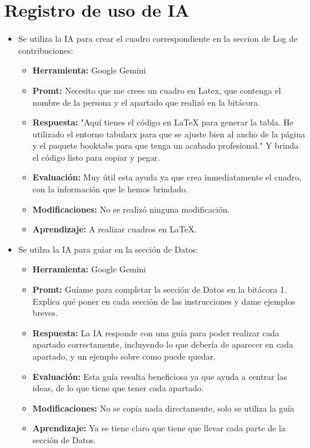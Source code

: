 \documentclass[12pt]{article}
\begin{document}
\section{Registro de uso de IA}
\begin{itemize}
    \item Se utiliza la IA para crear el cuadro correspondiente en la seccion de Log de contribuciones:
    \begin{itemize}
        \item \textbf{Herramienta:} Google Gemini
        \item \textbf{Promt:} Necesito que me crees un cuadro en Latex, que contenga el nombre de la persona y el apartado que realizó en la bitácora.
        \item \textbf{Respuesta:} "Aquí tienes el código en LaTeX para generar la tabla. He utilizado el entorno tabularx para que se ajuste bien al ancho de la página y el paquete booktabs para que tenga un acabado profesional." Y brinda el código listo para copiar y pegar.
        \item \textbf{Evaluación:} Muy útil esta ayuda ya que crea inmediatamente el cuadro, con la información que le hemos brindado.
        \item \textbf{Modificaciones:} No se realizó ninguna modificación.
        \item \textbf{Aprendizaje:} A realizar cuadros en LaTeX.
    \end{itemize}
    \item Se utilza la IA para guiar en la sección de Datos:
    \begin{itemize}
         \item \textbf{Herramienta:} Google Gemini
        \item \textbf{Promt:} Guíame para completar la sección de Datos en la bitácora 1. Explica qué poner en cada sección de las instrucciones y dame ejemplos breves.
        \item \textbf{Respuesta:} La IA responde con una guía para poder realizar cada apartado correctamente, incluyendo lo que debería de aparecer en cada apartado, y un ejemplo sobre como puede quedar.
        \item \textbf{Evaluación:} Esta guía resulta beneficiosa ya que ayuda a centrar las ideas, de lo que tiene que tener cada apartado.
        \item \textbf{Modificaciones:} No se copia nada directamente, solo se utiliza la guía
        \item \textbf{Aprendizaje:} Ya se tiene claro que tiene que llevar cada parte de la sección de Datos.
    \end{itemize}
\end{itemize}
\end{document}
